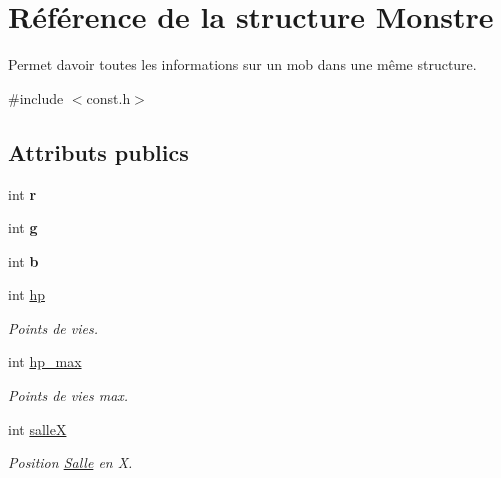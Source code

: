 \hypertarget{structMonstre}{}\section{Référence de la structure Monstre}
\label{structMonstre}


Permet d\textquotesingle{}avoir toutes les informations sur un mob dans une même structure.  




{\ttfamily \#include $<$const.\+h$>$}

\subsection*{Attributs publics}
\begin{DoxyCompactItemize}
\item 
\mbox{\label{structMonstre_a162228eff338676ea24ffe4e815cb7b7}} 
int {\bfseries r}
\item 
\mbox{\label{structMonstre_a9d528b6ccb47845eb4f1dfbb7794ffea}} 
int {\bfseries g}
\item 
\mbox{\label{structMonstre_ab5e63640078cd4dd4eeaa560da41fe28}} 
int {\bfseries b}
\item 
\mbox{\label{structMonstre_aa02914b052d2ca5194dffde9535050d1}} 
int \hyperlink{structMonstre_aa02914b052d2ca5194dffde9535050d1}{hp}
\begin{DoxyCompactList}\small\item\em Points de vies. \end{DoxyCompactList}\item 
\mbox{\label{structMonstre_abea4d6613ce6e8bf8976d78aa8b660f8}} 
int \hyperlink{structMonstre_abea4d6613ce6e8bf8976d78aa8b660f8}{hp\+\_\+max}
\begin{DoxyCompactList}\small\item\em Points de vies max. \end{DoxyCompactList}\item 
\mbox{\label{structMonstre_a08aac75a04ef61978759dd2780260e23}} 
int \hyperlink{structMonstre_a08aac75a04ef61978759dd2780260e23}{salleX}
\begin{DoxyCompactList}\small\item\em Position \hyperlink{structSalle}{Salle} en X. \end{DoxyCompactList}\item 

\end{DoxyCompactItemize}
